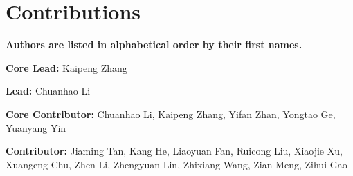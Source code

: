 \section{Contributions}

\textbf{Authors are listed in alphabetical order by their first names.}

\textbf{Core Lead:}
Kaipeng Zhang

\textbf{Lead:}
Chuanhao Li

\textbf{Core Contributor:}
Chuanhao Li, Kaipeng Zhang, Yifan Zhan, Yongtao Ge, Yuanyang Yin

\textbf{Contributor:}
Jiaming Tan, Kang He, Liaoyuan Fan, Ruicong Liu, Xiaojie Xu, Xuangeng Chu, Zhen Li, Zhengyuan Lin, Zhixiang Wang, Zian Meng, Zihui Gao

